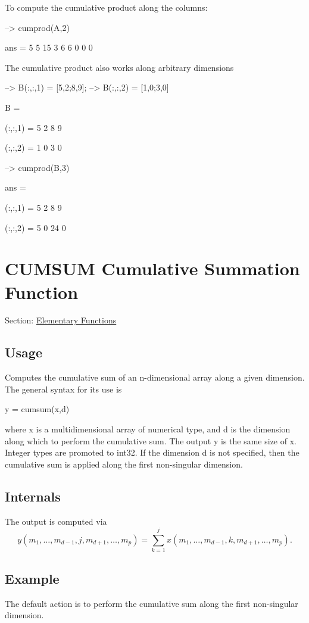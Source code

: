 To compute the cumulative product along the columns\-:


\begin{DoxyVerbInclude}
--> cumprod(A,2)

ans = 
  5  5 15 
  3  6  6 
  0  0  0 
\end{DoxyVerbInclude}


The cumulative product also works along arbitrary dimensions


\begin{DoxyVerbInclude}
--> B(:,:,1) = [5,2;8,9];
--> B(:,:,2) = [1,0;3,0]

B = 

(:,:,1) = 
 5 2 
 8 9 

(:,:,2) = 
 1 0 
 3 0 

--> cumprod(B,3)

ans = 

(:,:,1) = 
  5  2 
  8  9 

(:,:,2) = 
  5  0 
 24  0 
\end{DoxyVerbInclude}
 \hypertarget{elementary_cumsum}{}\section{C\-U\-M\-S\-U\-M Cumulative Summation Function}\label{elementary_cumsum}
Section\-: \hyperlink{sec_elementary}{Elementary Functions} \hypertarget{vtkwidgets_vtkxyplotwidget_Usage}{}\subsection{Usage}\label{vtkwidgets_vtkxyplotwidget_Usage}
Computes the cumulative sum of an n-\/dimensional array along a given dimension. The general syntax for its use is \begin{DoxyVerb}  y = cumsum(x,d)
\end{DoxyVerb}
 where {\ttfamily x} is a multidimensional array of numerical type, and {\ttfamily d} is the dimension along which to perform the cumulative sum. The output {\ttfamily y} is the same size of {\ttfamily x}. Integer types are promoted to {\ttfamily int32}. If the dimension {\ttfamily d} is not specified, then the cumulative sum is applied along the first non-\/singular dimension. \hypertarget{transforms_svd_Function}{}\subsection{Internals}\label{transforms_svd_Function}
The output is computed via \[ y(m_1,\ldots,m_{d-1},j,m_{d+1},\ldots,m_{p}) = \sum_{k=1}^{j} x(m_1,\ldots,m_{d-1},k,m_{d+1},\ldots,m_{p}). \] \hypertarget{variables_struct_Example}{}\subsection{Example}\label{variables_struct_Example}
The default action is to perform the cumulative sum along the first non-\/singular dimension.


